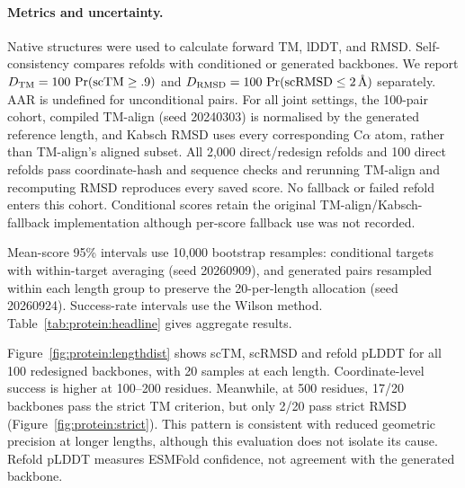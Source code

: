 
\paragraph{Metrics and uncertainty.} Native structures were used to calculate forward TM, lDDT, and RMSD. Self-consistency compares refolds with conditioned or generated backbones. We report $D_{\rm TM}=100\,\Pr(\mathrm{scTM}\geq.9)$ and $D_{\rm RMSD}=100\,\Pr(\mathrm{scRMSD}\leq2\,\text{\AA})$ separately. AAR is undefined for unconditional pairs. For all joint settings, the 100-pair cohort, compiled TM-align (seed 20240303) is normalised by the generated reference length, and Kabsch RMSD uses every corresponding C$\alpha$ atom, rather than TM-align's aligned subset. All 2,000 direct/redesign refolds and 100 direct refolds pass coordinate-hash and sequence checks and rerunning TM-align and recomputing RMSD reproduces every saved score. No fallback or failed refold enters this cohort. Conditional scores retain the original TM-align/Kabsch-fallback implementation although per-score fallback use was not recorded.

Mean-score 95\% intervals use 10{,}000 bootstrap resamples: conditional targets with within-target averaging (seed 20260909), and generated pairs resampled within each length group to preserve the 20-per-length allocation (seed 20260924). Success-rate intervals use the Wilson method. Table~\ref{tab:protein:headline} gives aggregate results.

Figure~\ref{fig:protein:lengthdist} shows scTM, scRMSD and refold pLDDT for all 100 redesigned backbones, with 20 samples at each length. Coordinate-level success is higher at 100--200 residues. Meanwhile, at 500 residues, 17/20 backbones pass the strict TM criterion, but only 2/20 pass strict RMSD (Figure~\ref{fig:protein:strict}). This pattern is consistent with reduced geometric precision at longer lengths, although this evaluation does not isolate its cause. Refold pLDDT measures ESMFold confidence, not agreement with the generated backbone.

